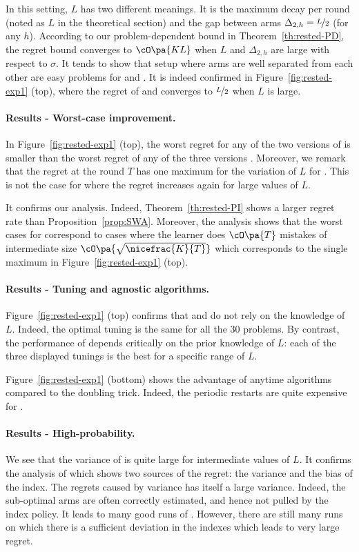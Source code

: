 In this setting, $L$ has two different meanings. It is the maximum decay per round (noted as $L$ in the theoretical section) and the gap between arms $\Delta_{2,h} = \nicefrac{L}{2}$ (for any $h$). According to our problem-dependent bound in Theorem~\ref{th:rested-PD}, the regret bound converges to $\cO\pa{KL}$ when $L$ and $\Delta_{2,h}$ are large with respect to $\sigma$. It tends to show that setup where arms are well separated from each other are easy problems for \FEWA and \RAWUCB. It is indeed confirmed in Figure~\ref{fig:rested-exp1} (top), where the regret of \FEWA and \RAWUCB converges to $\nicefrac{L}{2}$ when $L$ is large.

\paragraph{Results - Worst-case improvement.}
In Figure~\ref{fig:rested-exp1} (top), the worst regret for any of the two versions of \RAWUCB is smaller than the worst regret of any of the three versions \wSWA. Moreover, we remark that the regret at the round $T$ has one maximum for the variation of $L$ for \RAWUCB. This is not the case for \wSWA where the regret increases again for large values of $L$.

It confirms our analysis. Indeed, Theorem~\ref{th:rested-PI} shows a larger regret rate than Proposition~\ref{prop:SWA}. Moreover, the analysis shows that the worst cases for \RAWUCB correspond to cases where the learner does $\cO\pa{T}$ mistakes of intermediate size  $\cO\pa{\sqrt{\nicefrac{K}{T}}}$ which corresponds to the single maximum in Figure~\ref{fig:rested-exp1} (top).  

\paragraph{Results - Tuning and agnostic algorithms.}
Figure~\ref{fig:rested-exp1} (top) confirms that \FEWA and \RAWUCB do not rely on the knowledge of $L$. Indeed, the optimal tuning is the same for all the 30 problems. By contrast, the performance of \wSWA depends critically on the prior knowledge of  $L$: each of the three displayed tunings is the best for a specific range of $L$. 

Figure~\ref{fig:rested-exp1} (bottom) shows the advantage of anytime algorithms compared to the doubling trick. Indeed, the periodic restarts are quite expensive for \wSWA.  

\paragraph{Results - High-probability.}
We see that the variance of \wSWA is quite large for intermediate values of $L$. It confirms the analysis of \wSWA which shows two sources of the regret: the variance and the bias of the index. The regrets caused by variance has itself a large variance. Indeed, the sub-optimal arms are often correctly estimated, and hence not pulled by the index policy. It leads to many good runs of \wSWA. However, there are still many runs on which there is a sufficient deviation in the indexes which leads to very large regret. 

